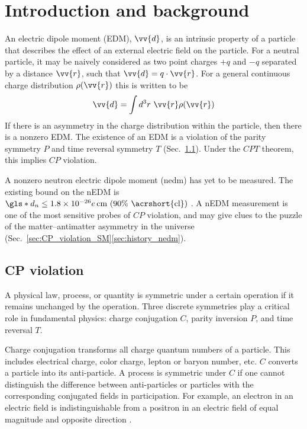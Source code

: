 
\chapter{Introduction and background}


An electric dipole moment (EDM), $\vv{d}$, is an intrinsic property of a particle that describes the effect of an external electric field on the particle. For a neutral particle, it may be naively considered as two point charges $+q$ and $-q$ separated by a distance $\vv{r}$, such that $\vv{d}=q\cdot \vv{r}$. For a general continuous charge distribution $\rho(\vv{r})$ this is written to be
%
\begin{gather}
    \vv{d}=\int d^3r\,\,\vv{r}\rho(\vv{r})
\end{gather}
%
If there is an asymmetry in the charge distribution within the particle, then there is a nonzero EDM. The existence of an EDM is a violation of the parity symmetry $P$ and time reversal symmetry $T$ (Sec.~\ref{sec:CP_violation}). Under the $CPT$ theorem, this implies $CP$ violation.

A nonzero neutron electric dipole moment (\acrshort*{nedm}) has yet to be measured. The existing bound on the nEDM is $\gls*{d_n}\leq 1.8\times10^{-26}e\,\text{cm (90\% \acrshort{cl})}$ \cite{pdg2022}. A nEDM measurement is one of the most sensitive probes of $CP$ violation, and may give clues to the puzzle of the matter–antimatter asymmetry in the universe (Sec.~\ref{sec:CP_violation_SM}\textendash\ref{sec:history_nedm}).


\section{CP violation}\label{sec:CP_violation}


A physical law, process, or quantity is symmetric under a certain operation if it remains unchanged by the operation. Three discrete symmetries play a critical role in fundamental physics: charge conjugation $C$, parity inversion $P$, and time reversal $T$.

Charge conjugation transforms all charge quantum numbers of a particle. This includes electrical charge, color charge, lepton or baryon number, etc. $C$ converts a particle into its anti-particle. A process is symmetric under $C$ if one cannot distinguish the difference between anti-particles or particles with the corresponding conjugated fields in participation. For example, an electron in an electric field is indistinguishable from a positron in an electric field of equal magnitude and opposite direction \cite{schmidt-wellenburg_quest_2017}.


